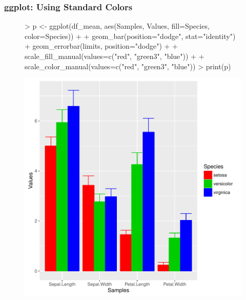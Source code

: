 \documentclass{beamer}
\begin{document}
\begin{frame}[containsverbatim]  
	\frametitle{ggplot: Using Standard Colors}
\tiny
\begin{figure}
  \centering
\begin{Schunk}
\begin{Sinput}
> p <- ggplot(df_mean, aes(Samples, Values, fill=Species, color=Species)) + 
+             geom_bar(position="dodge", stat="identity") + geom_errorbar(limits, position="dodge") + 
+             scale_fill_manual(values=c("red", "green3", "blue")) + 
+             scale_color_manual(values=c("red", "green3", "blue")) 
> print(p) 
\end{Sinput}
\end{Schunk}
\includegraphics{fig--062}
\label{fig:qplotscatter}
\end{figure}
\end{frame}
\end{document}
